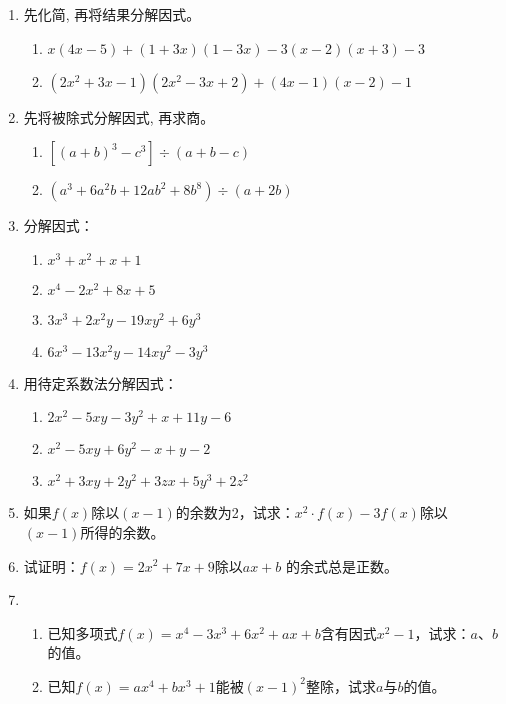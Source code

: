\begin{enumerate}
\item 先化简, 再将结果分解因式。
\begin{enumerate}
    \item  $x(4 x-5)+(1+3 x)(1-3 x)-3(x-2)(x+3)-3$
\item  $\left(2 x^{2}+3 x-1\right)\left(2 x^{2}-3 x+2\right)+(4 x-1)(x-2)-1$
\end{enumerate}

\item 先将被除式分解因式, 再求商。
\begin{enumerate}
    \item $\left[(a+b)^{3}-c^{3}\right]\div (a+b-c)$
\item $\left(a^{3}+6 a^{2} b+12 a b^{2}+8 b^{8}\right)\div (a+2 b)$
\end{enumerate}

\item 分解因式：
\begin{multicols}{2}
\begin{enumerate}
    \item $x^{3}+x^{2}+x+1$
\item $x^{4}-2 x^{2}+8 x+5$ 
\item $3 x^{3}+2 x^{2} y-19 x {y}^{2}+6 y^{3}$
\item $6 x^{3}-13 x^{2} y-14 x y^{2}-3 y^{3}$
\end{enumerate}
\end{multicols}
\item 用待定系数法分解因式：
\begin{enumerate}
\item $2 x^{2}-5 x y-3 y^{2}+x+11 y-6$
\item $x^{2}-5 x y+6 y^{2}-x+y-2 $
\item $x^{2}+3 x y+2 y^{2}+3 z x+5 y^{3}+2 z^{2}$
\end{enumerate}


\item 如果$f(x)$除以$(x-1)$的余数为2，试求：$x^2\cdot f(x)-3f(x)$除以$(x-1)$所得的余数。

\item 试证明：$f(x)=2x^2+7x+9$除以$ax+b$ 的余式总是正数。
\item 
\begin{enumerate}
\item 已知多项式$f(x)=x^4-3x^3+6x^2+ax+b$含有因式$x^2-1$，试求：$a$、$b$的值。
\item 已知$f(x)=ax^4+bx^3+1$能被$(x-1)^2$整除，试求$a$与$b$的值。
\end{enumerate}


\end{enumerate}
